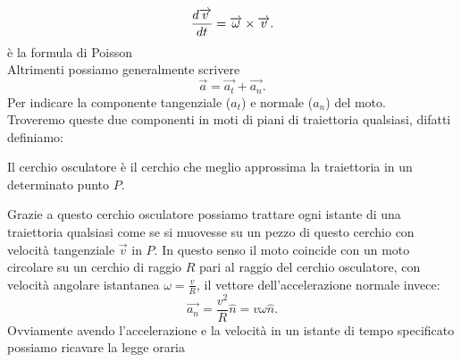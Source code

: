 \documentclass[12px]{article}
\begin{document}
	\[
		\frac{d  \overrightarrow{v}}{d t} = \overrightarrow\omega \times \overrightarrow{v}
	.\]  è la formula di Poisson\\
	Altrimenti possiamo generalmente scrivere 
	\[
	\overrightarrow{a} = \overrightarrow{a_t} + \overrightarrow{a_n}
	.\] 
	Per indicare la componente tangenziale ($a_t$) e normale ($a_n$) del moto.\\
	Troveremo queste due componenti in moti di piani di traiettoria qualsiasi, difatti definiamo:
	\begin{defi}
		Il cerchio osculatore è il cerchio che meglio approssima la traiettoria in un determinato punto $P$.
	\end{defi}
Grazie a questo cerchio osculatore possiamo trattare ogni istante di una traiettoria qualsiasi come se si muovesse su un pezzo di questo cerchio con velocità tangenziale $\overrightarrow{v}$ in $P$. In questo senso il moto coincide con un moto circolare su un cerchio di raggio  $R$ pari al raggio del cerchio osculatore, con velocità angolare istantanea $\omega = \frac v R$, il vettore dell'accelerazione normale invece:
 \[
	 \overrightarrow{a_n} = \frac { v^2}R\hat n = v\omega \hat n
.\]  
Ovviamente avendo l'accelerazione e la velocità in un istante di tempo specificato possiamo ricavare la legge oraria
\end{document}
